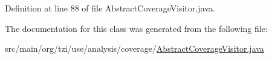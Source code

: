 Definition at line 88 of file Abstract\-Coverage\-Visitor.\-java.



The documentation for this class was generated from the following file\-:\begin{DoxyCompactItemize}
\item 
src/main/org/tzi/use/analysis/coverage/\hyperlink{_abstract_coverage_visitor_8java}{Abstract\-Coverage\-Visitor.\-java}\end{DoxyCompactItemize}
